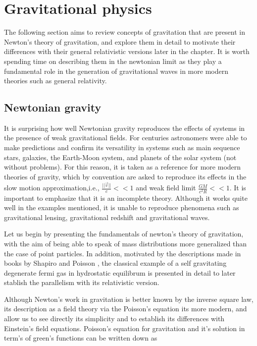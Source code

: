\chapter{Gravitational physics}\label{gravphys}

The following section aims to review concepts of gravitation that are present in Newton's theory of gravitation, and explore them in detail to motivate their differences with their general relativistic versions later in the chapter. It is worth spending time on describing them in the newtonian limit as they play a fundamental role in the generation of gravitational waves in more modern theories such as general relativity. 


\section{Newtonian gravity}

It is surprising how well Newtonian gravity reproduces the effects of systems in the presence of weak gravitational fields. For centuries astronomers were able to make predictions and confirm its versatility in systems such as main sequence stars, galaxies, the Earth-Moon system, and planets of the solar system (not without problems). For this reason, it is taken as a reference for more modern theories of gravity, which by convention are asked to reproduce its effects in the slow motion approximation,i.e., $\frac{||\vec{v}||}{c} << 1$ and weak field limit $\frac{GM}{c^2 R} <<1$. It is important to emphasize that it is an incomplete theory. Although it works quite well in the examples mentioned, it is unable to reproduce phenomena such as gravitational lensing, gravitational redshift and gravitational waves.


Let us begin by presenting the fundamentals of newton's theory of gravitation, with the aim of being able to speak of mass distributions more generalized than the case of point particles. In addition, motivated by the descriptions made in books by Shapiro\cite{Shapiro:1983du} and Poisson \cite{poisson_will_2014}, the classical example of a self gravitating degenerate fermi gas in hydrostatic equilibrum is presented in detail to later stablish the parallelism with its relativistic version.

Although Newton's work in gravitation is better known by the inverse square law, its description as a field theory via the Poisson's equation its more modern, and allow us to see directly its simplicity and to establish its differences with Einstein's field equations. Poisson's equation for gravitation and it's solution in term's of green's functions can be written down as 

